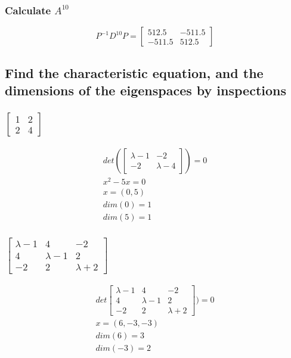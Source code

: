 \documentclass[12pt, a4paper]{article}
\begin{document}
			\subsubsection{Calculate $A^{10}$}
				$$P^{-1}D^{10}P=\begin{bmatrix}512.5&-511.5\\-511.5&512.5\end{bmatrix}$$
		\subsection{Find the characteristic equation, and the dimensions of the eigenspaces by inspections}
			\subsubsection{$\begin{bmatrix}1&2\\2&4\end{bmatrix}$}
				\begin{align*}
					det(\begin{bmatrix}\lambda-1&-2\\-2&\lambda-4\end{bmatrix})=0\\
					x^2-5x=0\\
					x=(0,5)\\
					dim(0)=1\\
					dim(5)=1
				\end{align*}
			\subsubsection{$\begin{bmatrix}\lambda-1&4&-2\\4&\lambda-1&2\\-2&2&\lambda+2\end{bmatrix}$}
				\begin{align*}
					det\begin{bmatrix}\lambda-1&4&-2\\4&\lambda-1&2\\-2&2&\lambda+2\end{bmatrix})=0\\
					x=(6,-3,-3)\\
					dim(6)=3\\
					dim(-3)=2
				\end{align*}
\end{document}
